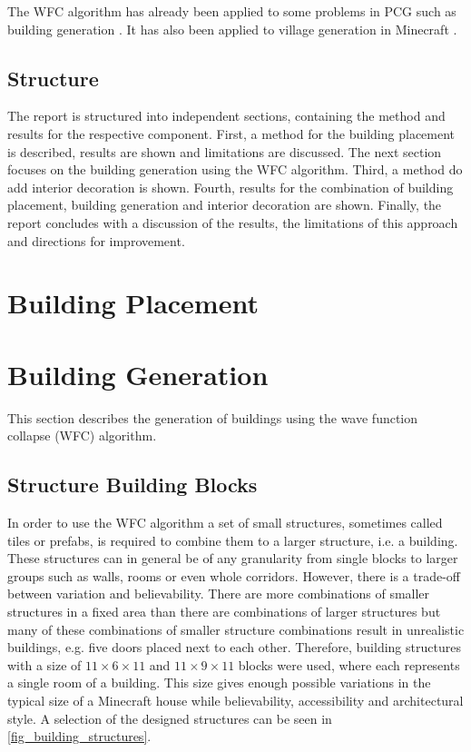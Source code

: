 \documentclass[
oneside,
fontsize=11pt
]{scrartcl}
\begin{document}
The WFC algorithm has already been applied to some 
problems in PCG such as building generation \cite{Eleni-2020}.
It has also been applied to village generation in Minecraft \cite{Mifek-2022}.


\subsection*{Structure}
The report is structured into independent sections, 
containing the method and results for the respective component.
First, a method for the building placement is described, results are shown and limitations are discussed.
The next section focuses on the building generation 
using the WFC algorithm. %
Third, a method do add interior decoration is shown.
Fourth, results for the combination of building placement, building generation and interior decoration are shown.
Finally, the report concludes with a discussion of the results, the limitations of this approach and 
directions for improvement.


\section{Building Placement}




\section{Building Generation}
This section describes the generation of buildings using the wave function collapse (WFC) algorithm.



\subsection{Structure Building Blocks}
In order to use the WFC algorithm a set of small structures, sometimes called tiles or prefabs, 
is required to combine them to a larger structure, i.e. a building. 
These structures can in general be of any granularity from single blocks 
to larger groups such as walls, rooms or even whole corridors. 
However, there is a trade-off between variation and believability.
There are more combinations of smaller structures in a fixed area 
than there are combinations of larger structures 
but many of these combinations of smaller structure combinations 
result in unrealistic buildings, e.g. five doors placed next to each other. 
Therefore, building structures with a size of 
$11 \times 6 \times 11$ and $11 \times 9 \times 11$  blocks 
were used, where each represents a single room of a building.  
This size gives enough possible variations in the typical size of a Minecraft house 
while believability, accessibility and architectural style. 
A selection of the designed structures can be seen in \autoref{fig_building_structures}.
\end{document}
